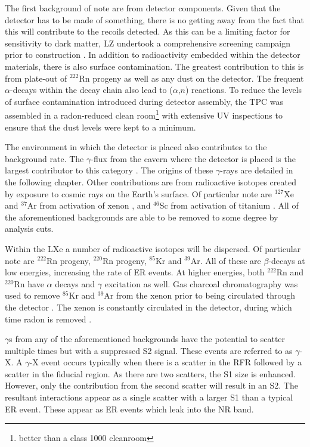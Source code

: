 \par
The first background of note are from detector components.
Given that the detector has to be made of something, there is no getting away from the fact that this will contribute to the recoils detected.
As this can be a limiting factor for sensitivity to dark matter, LZ undertook a comprehensive screening campaign prior to construction \cite{LZ_assay_ref}.
In addition to radioactivity embedded within the detector materials, there is also surface contamination.
The greatest contribution to this is from plate-out of ${}^{222}$Rn progeny as well as any dust on the detector.
The frequent $\alpha$-decays within the decay chain also lead to ($\alpha$,$n$) reactions.
To reduce the levels of surface contamination introduced during detector assembly, the TPC was assembled in a radon-reduced clean room\footnote{better than a class 1000 cleanroom} with extensive UV inspections to ensure that the dust levels were kept to a minimum.

\par
The environment in which the detector is placed also contributes to the background rate.
The $\gamma$-flux from the cavern where the detector is placed is the largest contributor to this category \cite{LZ_Gamma_Ray_Background_ref}.
The origins of these $\gamma$-rays are detailed in the following chapter.
Other contributions are from radioactive isotopes created by exposure to cosmic rays on the Earth's surface.
Of particular note are $^{127}$Xe and ${}^{37}$Ar from activation of xenon \cite{lux_xenon_activation_ref,lz_argon37_ref}, and $^{46}$Sc from activation of titanium \cite{LZ_TechnicalDesignReview_ref}.
All of the aforementioned backgrounds are able to be removed to some degree by analysis cuts.

\par
Within the LXe a number of radioactive isotopes will be dispersed.
Of particular note are $^{222}$Rn progeny, $^{220}$Rn progeny, $^{85}$Kr and $^{39}$Ar.
All of these are $\beta$-decays at low energies, increasing the rate of ER events.
At higher energies, both $^{222}$Rn and $^{220}$Rn have $\alpha$ decays and $\gamma$ excitation as well.
Gas charcoal chromatography was used to remove $^{85}$Kr and $^{39}$Ar from the xenon prior to being circulated through the detector \cite{xenon_prufication_chromatography_ref}.
The xenon is constantly circulated in the detector, during which time radon is removed \cite{marisarthurs_thesis_ref}.

\par
$\gamma$s from any of the aforementioned backgrounds have the potential to scatter multiple times but with a suppressed S2 signal.
These events are referred to as $\gamma$-X.
A $\gamma$-X event occurs typically when there is a scatter in the RFR followed by a scatter in the fiducial region.
As there are two scatters, the S1 size is enhanced.
However, only the contribution from the second scatter will result in an S2.
The resultant interactions appear as a single scatter with a larger S1 than a typical ER event.
These appear as ER events which leak into the NR band.



